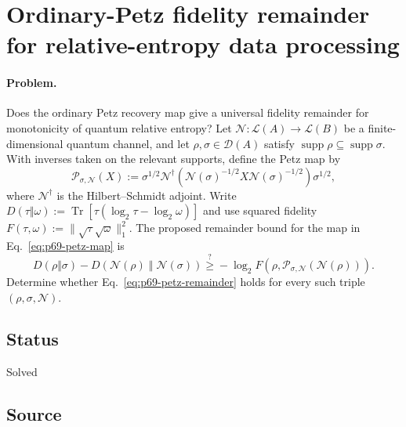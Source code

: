 \section{Ordinary-Petz fidelity remainder for relative-entropy data processing}
\label{sec:op_cbc0bf88b109b122}

\paragraph{Problem.}
Does the ordinary Petz recovery map give a universal fidelity remainder for
monotonicity of quantum relative entropy?  Let
$\mathcal N:\mathcal L(A)\to\mathcal L(B)$ be a finite-dimensional quantum
channel, and let $\rho,\sigma\in\mathcal D(A)$ satisfy
$\operatorname{supp}\rho\subseteq\operatorname{supp}\sigma$.  With inverses
taken on the relevant supports, define the Petz map by
\begin{equation}
  \mathcal P_{\sigma,\mathcal N}(X)
  :=\sigma^{1/2}\mathcal N^{\dagger}\!\left(
      \mathcal N(\sigma)^{-1/2}X
      \mathcal N(\sigma)^{-1/2}
    \right)\sigma^{1/2},
  \label{eq:p69-petz-map}
\end{equation}
where $\mathcal N^{\dagger}$ is the Hilbert--Schmidt adjoint.  Write
$D(\tau\Vert\omega):=\operatorname{Tr}[\tau(\log_2\tau-
\log_2\omega)]$ and use squared fidelity
$F(\tau,\omega):=\lVert\sqrt\tau\sqrt\omega\rVert_1^2$.  The proposed
remainder bound for the map in Eq.~\eqref{eq:p69-petz-map} is
\begin{equation}
  D(\rho\Vert\sigma)
  -D\!\left(\mathcal N(\rho)\middle\Vert\mathcal N(\sigma)\right)
  \stackrel{?}{\geq}
  -\log_2 F\!\left(
    \rho,
    \mathcal P_{\sigma,\mathcal N}(\mathcal N(\rho))
  \right).
  \label{eq:p69-petz-remainder}
\end{equation}
Determine whether Eq.~\eqref{eq:p69-petz-remainder} holds for every such
triple $(\rho,\sigma,\mathcal N)$.

\subsection*{Status}

Solved

\subsection*{Source}

